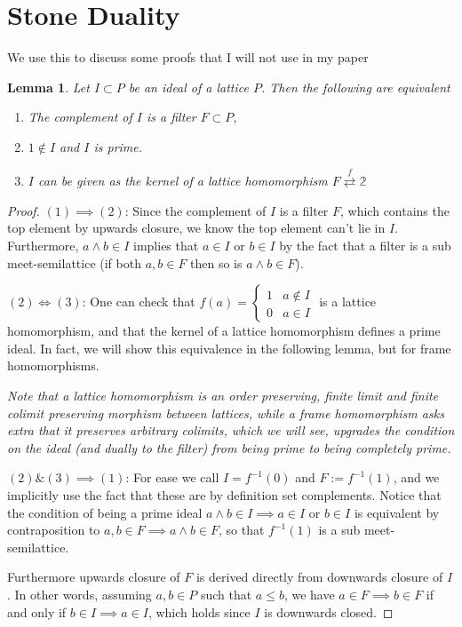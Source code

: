 \documentclass[12pt,a4paper]{article}
\newtheorem{lemma}{Lemma}[section] %
\begin{document}
\pagestyle{fancy}
\fancyhf{}
\rfoot{\thepage}
\section{Stone Duality}
We use this to discuss some proofs that I will not use in my paper

\begin{lemma}
	Let $I \subset P$ be an ideal of a lattice $P$. Then the following are equivalent 
	\begin{enumerate}
		\item The complement of $I$ is a filter $F \subset P$,
		\item $1 \notin I$ and $I$ is prime.
		\item $I$ can be given as the kernel of a lattice homomorphism $F \stackrel{f}{\rightleftarrows} \mathbb{2}$
	\end{enumerate}
\end{lemma}
\begin{proof}
	$(1) \implies (2)$: Since the complement of $I$ is a filter $F$, which contains the top element by upwards closure, we know the top element can't lie in $I$. Furthermore, $a \land b \in I$ implies that $a \in I$ or $b \in I$ by the fact that a filter is a sub meet-semilattice (if both $a, b \in F$ then so is $a \land b \in F$).
	
	$(2) \iff (3)$: One can check that  $f(a) =  \begin{cases}
   1 & a \notin I \\
    0 & a \in I
  \end{cases}$ is a lattice homomorphism, and that the kernel of a lattice homomorphism defines a prime ideal. In fact, we will show this equivalence in the following lemma, but for frame homomorphisms. 
  
  \emph{Note that a lattice homomorphism is an order preserving, finite limit and finite colimit preserving morphism between lattices, while a frame homomorphism asks extra that it preserves arbitrary colimits, which we will see, upgrades the condition on the ideal (and dually to the filter) from being prime to being completely prime.}
  
  $(2) \& (3) \implies (1)$:  For ease we call $I = f^{-1}(0)$ and $F:= f^{-1}(1)$, and we implicitly use the fact that these are by definition set complements. Notice that the condition of being a prime ideal $a \land b \in I \implies a \in I$ or $b \in I$ is equivalent by contraposition to $a, b \in F \implies a \land b \in F$, so that $f^{-1}(1)$ is a sub meet-semilattice.
  
  Furthermore upwards closure of $F$ is derived directly from downwards closure of $I$. In other words, assuming $a, b \in P$ such that $a \leq b$, we have $a \in F \implies b \in F$ if and only if $ b \in I\implies a \in I$, which holds since $I$ is downwards closed.
\end{proof}
\end{document}
